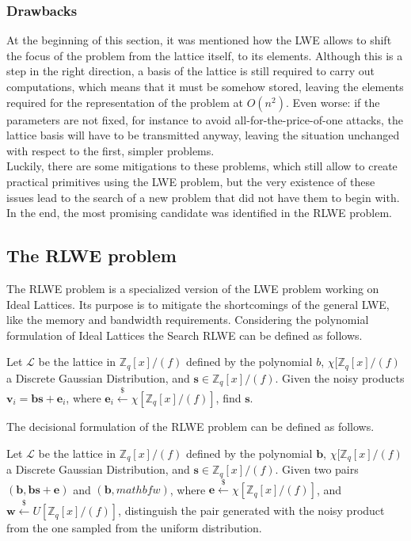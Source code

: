 \subsubsection{Drawbacks}
At the beginning of this section, it was mentioned how the LWE allows to shift the focus of the problem from the lattice itself, to its elements. Although this is a step in the right direction, a basis of the lattice is still required to carry out computations, which means that it must be somehow stored, leaving the elements required for the representation of the problem at $O(n^2)$. Even worse: if the parameters are not fixed, for instance to avoid all-for-the-price-of-one attacks, the lattice basis will have to be transmitted anyway, leaving the situation unchanged with respect to the first, simpler problems.\\
Luckily, there are some mitigations to these problems, which still allow to create practical primitives using the LWE problem, but the very existence of these issues lead to the search of a new problem that did not have them to begin with. In the end, the most promising candidate was identified in the RLWE problem.

\subsection{The RLWE problem}
The RLWE problem is a specialized version of the LWE problem working on Ideal Lattices. Its purpose is to mitigate the shortcomings of the general LWE, like the memory and bandwidth requirements. Considering the polynomial formulation of Ideal Lattices the Search RLWE can be defined as follows.

\begin{definition}
Let $\mathscr{L}$ be the lattice in $\mathbb{Z}_q[x]/(f)$ defined by the polynomial $b$, $\chi[\mathbb{Z}_q[x]/(f)$ a Discrete Gaussian Distribution, and $\mathbf{s}\in\mathbb{Z}_q[x]/(f)$. Given the noisy products $\mathbf{v}_i=\mathbf{bs} + \mathbf{e}_i$, where $\mathbf{e}_i\xleftarrow{\$}\chi[\mathbb{Z}_q[x]/(f)]$, find $\mathbf{s}$.
\end{definition}

The decisional formulation of the RLWE problem can be defined as follows.

\begin{definition}
\sloppy Let $\mathscr{L}$ be the lattice in $\mathbb{Z}_q[x]/(f)$ defined by the polynomial $\mathbf{b}$, $\chi[\mathbb{Z}_q[x]/(f)$ a Discrete Gaussian Distribution, and \mbox{$\mathbf{s}\in\mathbb{Z}_q[x]/(f)$}. Given two pairs $(\mathbf{b},\mathbf{bs} + \mathbf{e})$ and $(\mathbf{b},mathbf{w})$, where \mbox{$\mathbf{e}\xleftarrow{\$}\chi[\mathbb{Z}_q[x]/(f)]$}, and \mbox{$\mathbf{w}\xleftarrow{\$}U[\mathbb{Z}_q[x]/(f)]$}, distinguish the pair generated with the noisy product from the one sampled from the uniform distribution. 
\end{definition}

